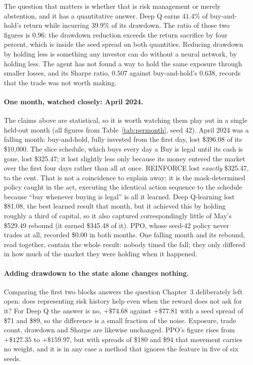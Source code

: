 The question that matters is whether that is risk management or merely
abstention, and it has a quantitative answer. Deep Q earns $41.4\%$ of
buy-and-hold's return while incurring $39.9\%$ of its drawdown. The ratio of
those two figures is $0.96$: the drawdown reduction exceeds the return sacrifice
by four percent, which is inside the seed spread on both quantities. Reducing
drawdown by holding less is something any investor can do without a neural
network, by holding less. The agent has not found a way to hold the same
exposure through smaller losses, and its Sharpe ratio, $0.507$ against
buy-and-hold's $0.638$, records that the trade was not worth making.

\paragraph{One month, watched closely: April 2024.} The claims above are
statistical, so it is worth watching them play out in a single held-out
month (all figures from Table~\ref{tab:permonth}, seed 42). April 2024 was
a falling month: buy-and-hold, fully invested from the first day, lost
\$396.08 of its \$10{,}000. The slice schedule, which buys every day a Buy
is legal until its cash is gone, lost \$325.47; it lost slightly less only
because its money entered the market over the first four days rather than
all at once. REINFORCE lost \emph{exactly} \$325.47, to the cent. That is
not a coincidence to explain away; it is the mask-determined policy caught
in the act, executing the identical action sequence to the schedule
because ``buy whenever buying is legal'' is all it learned. Deep
Q-learning lost \$81.08, the best learned result that month, but it
achieved this by holding roughly a third of capital, so it also captured
correspondingly little of May's \$529.49 rebound (it earned \$345.48 of
it). PPO, whose seed-42 policy never trades at all, recorded \$0.00 in
both months. One falling month and its rebound, read together, contain
the whole result: nobody timed the fall; they only differed in how much
of the market they were holding when it happened.

\paragraph{Adding drawdown to the state alone changes nothing.} Comparing the
first two blocks answers the question Chapter~3 deliberately left open: does
representing risk history help even when the reward does not ask for it? For
Deep Q the answer is no, $+\$74.68$ against $+\$77.81$ with a seed spread of
\$71 and \$89, so the difference is a small fraction of the noise. Exposure,
trade count, drawdown and Sharpe are likewise unchanged. PPO's figure rises from
$+\$127.35$ to $+\$159.97$, but with spreads of \$180 and \$94 that movement
carries no weight, and it is in any case a method that ignores the feature in
five of six seeds.

